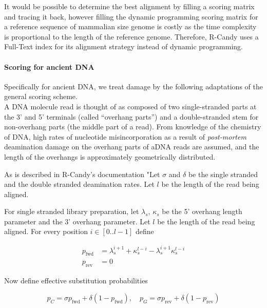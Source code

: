 \documentclass[11pt,a4paper]{report}
\begin{document}
It would be possible to determine the best alignment by filling a 
scoring matrix and tracing it back, however filling the dynamic 
programming scoring matrix for a reference sequence of mammalian 
size genome is costly as the time complexity is proportional to 
the length of the reference genome. Therefore, R-Candy uses a 
Full-Text index for its alignment strategy instead of dynamic 
programming. 



\paragraph{Scoring for ancient DNA} \label{Scoring}


Specifically for ancient DNA, we treat damage by the following
adaptations of the general scoring scheme.\\
A DNA molecule read is thought of as composed of two single-stranded parts at 
the 3' and 5' terminals (called ``overhang parts'') and a 
double-stranded stem for non-overhang parts (the middle part of
a read). From knowledge of the chemistry of DNA\cite{DNAchemistry}, high rates 
of nucleotide misincorporation as a result of \emph{post-mortem} 
deamination damage on the overhang parts of aDNA reads are assumed, and
the length of the overhangs is approximately 
geometrically distributed\cite{mapdamage2}. 

As is described in R-Candy's documentation \cite{R-CandyDocumentation}
"Let $\sigma$ and $\delta$ be the single stranded and the double stranded
deamination rates.  Let $l$ be the length of the read being aligned.  

For single stranded library preparation, let $\lambda_s$, $\kappa_s$ be
the 5' overhang length parameter and the 3' overhang parameter.  Let $l$
be the length of the read being aligned.  For every position $i \in
[0..l-1]$ define

\begin{align*}
p_{\mbox{fwd}} &= \lambda_s^{i+1} + \kappa_s^{l-i} - \lambda_s^{i+1} \kappa_s^{l-i} \\
p_{\mbox{rev}} &= 0
\end{align*}

Now define effective substitution probabilities

\begin{equation*}
p_{C} = \sigma p_{\mbox{fwd}} + \delta (1 - p_{\mbox{fwd}}), \quad
p_{G} = \sigma p_{\mbox{rev}} + \delta (1 - p_{\mbox{rev}}) 
\end{equation*}
\end{document}
